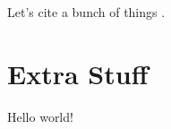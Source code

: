 \documentclass[master]{thesis}
\begin{document}
Let's cite a bunch of things \cite{forney20112749, cebl, forney2011thesis, forney2015echostate, haykin2009neural}.

\appendix %

\chapter{Extra Stuff}
\label{appendix:extra}
Hello world!

\backmatter %

{}



\end{document}

